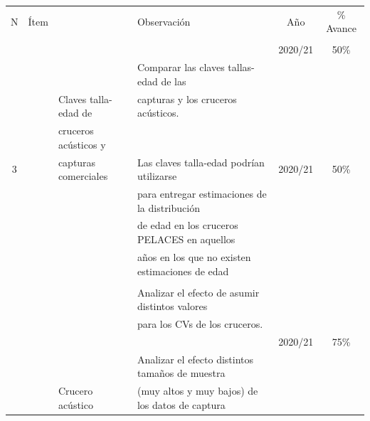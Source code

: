 \documentclass[
  spanish,
]{article}
\begin{document}
\begin{table}[h]
  \centering
  \resizebox{16cm}{!} {
  \begin{tabular}{|c|l|l|l|c|c|}
  \hline
  N  &  Ítem           &                      &   Observación                                    &  Año        &    \% Avance \\ 
     &               &                      &                                                  &             & \\ \hline
     &               &                      &                                                  & 2020/21     & 50\% \\
     &               &                      & Comparar las claves tallas-edad de las           &             & \\
     &               & Claves talla-edad de & capturas y los cruceros acústicos.               &             & \\
     &               & cruceros acústicos y &                                                  &             & \\        
   3 &               & capturas comerciales & Las claves talla-edad podrían utilizarse         & 2020/21     & 50\% \\
     &               &                      & para entregar estimaciones de la distribución    &             & \\
     &               &                      & de edad en los cruceros PELACES en aquellos      &             & \\
     &               &                      & años en los que no existen estimaciones de edad  &             & \\ \hline
     &               &                      &                                                  &             & \\
     &               &                      & Analizar el efecto de asumir distintos valores   &             & \\
     &               &                      & para los CVs de los cruceros.                    &             & \\
     &               &                      &                                                  & 2020/21     & 75\% \\
     &               &                      & Analizar el efecto distintos tamaños de muestra  &             & \\ 
     &               & Crucero acústico     & (muy altos y muy bajos) de los datos de captura  &             & \\

\end{tabular}}
\end{table}
\end{document}
